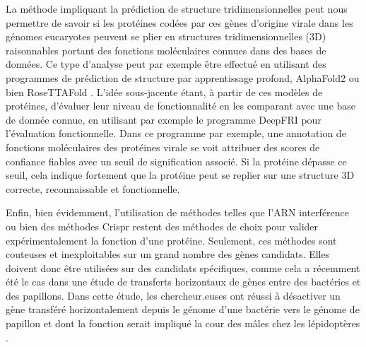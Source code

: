 La méthode impliquant la prédiction de structure tridimensionnelles peut nous permettre de savoir si les protéines codées par ces gènes d'origine virale dans les génomes eucaryotes peuvent se plier en structures tridimensionnelles (3D) raisonnables portant des fonctions moléculaires connues dans des bases de données. Ce type d'analyse peut par exemple être effectué en utilisant des programmes de prédiction de structure par apprentissage profond, AlphaFold2 \citep{jumper_highly_2021} ou bien RoseTTAFold \citep{baek_accurate_2021}. L'idée sous-jacente étant, à partir de ces modèles de protéines, d'évaluer leur niveau de fonctionnalité en les comparant avec une base de donnée connue, en utilisant par exemple le programme DeepFRI \citep{gligorijevic_structure-based_2021} pour l'évaluation fonctionnelle. Dans ce programme par exemple, une annotation de fonctions moléculaires des protéines virale se voit attribuer des scores de confiance fiables avec un seuil de signification associé. Si la protéine dépasse ce seuil, cela indique fortement que la protéine peut se replier sur une structure 3D correcte, reconnaissable et fonctionnelle.

Enfin, bien évidemment, l'utilisation de méthodes telles que l'ARN interférence ou bien des méthodes Crispr restent des méthodes de choix pour valider expérimentalement la fonction d’une protéine. Seulement, ces méthodes sont couteuses et inexploitables sur un grand nombre des gènes candidats. Elles doivent donc être utilisées sur des candidats spécifiques, comme cela a récemment été le cas dans une étude de transferts horizontaux de gènes entre des bactéries et des papillons. Dans cette étude, les chercheur.euses ont réussi à désactiver un gène transféré horizontalement depuis le génome d'une bactérie vers le génome de papillon et dont la fonction serait impliqué la cour des mâles chez les lépidoptères \cite{li_hgt_2022}.
